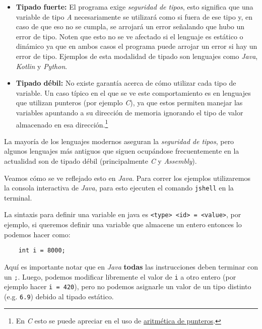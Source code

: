   \begin{itemize}
    \item \textbf{Tipado fuerte:} El programa exige \textit{seguridad de tipos}, esto significa 
      que una variable de tipo \textit{A} necesariamente se utilizará como si fuera de ese tipo
      y, en caso de que eso no se cumpla, se arrojará un error señalando que hubo un error de 
      tipo.
      Noten que esto no se ve afectado si el lenguaje es estático o dinámico ya que en ambos 
      casos el programa puede arrojar un error si hay un error de tipo.
      Ejemplos de esta modalidad de tipado son lenguajes como \textit{Java}, \textit{Kotlin} y
      \textit{Python}.
    \item \textbf{Tipado débil:} No existe garantía acerca de cómo utilizar cada tipo de 
      variable.
      Un caso típico en el que se ve este comportamiento es en lenguajes que utilizan punteros 
      (por ejemplo \textit{C}), ya que estos permiten manejar las variables apuntando a su 
      dirección de memoria ignorando el tipo de valor almacenado en esa dirección.\footnote{En 
      \textit{C} esto se puede apreciar en el uso de
      \href{https://www.tutorialspoint.com/cprogramming/c_pointer_arithmetic.htm}{aritmética de 
      punteros}.}
  \end{itemize}

  La mayoría de los lenguajes modernos aseguran la \textit{seguridad de tipos}, pero algunos 
  lenguajes más antiguos que siguen ocupándose frecuentemente en la actualidad son de tipado 
  débil (principalmente \textit{C} y \textit{Assembly}).

  Veamos cómo se ve reflejado esto en \textit{Java}.
  Para correr los ejemplos utilizaremos la consola interactiva de \textit{Java}, para esto ejecuten
  el comando \texttt{jshell} en la terminal.

  La sintaxis para definir una variable en java es \texttt{<type> <id> = <value>}, por ejemplo, si
  queremos definir una variable que almacene un entero entonces lo podemos hacer como:

  \begin{verbatim}
    int i = 8000;
  \end{verbatim}

  Aquí es importante notar que en \textit{Java} \textbf{todas} las instrucciones deben terminar con
  un \texttt{;}.
  Luego, podemos modificar libremente el valor de \texttt{i} a otro entero (por ejemplo hacer 
  \texttt{i = 420}), pero no podemos asignarle un valor de un tipo distinto (e.g. \texttt{6.9}) 
  debido al tipado estático.


